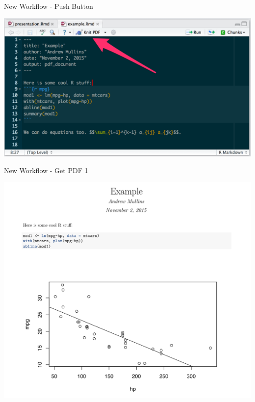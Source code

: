 \begin{frame}{New Workflow - Push Button}

\includegraphics{images/knit.png}

\end{frame}

\begin{frame}{New Workflow - Get PDF 1}

\includegraphics{images/pdf1.png}

\end{frame}

